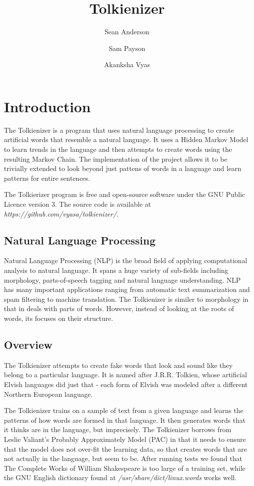 \documentclass[10pt]{article}
\begin{document}
\title{Tolkienizer}
\author{Sean Anderson \and Sam Payson \and Akanksha Vyas}

\section{Introduction}

The Tolkienizer is a program that uses natural language processing to create artificial
words that resemble a natural language. It uses a Hidden Markov Model to learn
trends in the language and then attempts to create words using the resulting Markov
Chain. The implementation of the project allows it to be trivially extended to
look beyond just pattens of words in a language and learn patterns 
for entire sentences.

The Tolkierizer program is free and open-source software under the GNU Public
Licence version 3. The source code is available at
\textit{https://github.com/vyasa/tolkienizer/}.

\subsection{Natural Language Processing}

Natural Language Processing (NLP) is the broad field of applying computational
analysis to natural language. It spans a huge variety of sub-fields including
morphology, parts-of-speech tagging and natural language understanding. NLP has
many important applications ranging from automatic text summarization and spam
filtering to machine translation. The Tolkienizer is similer to morphology in
that in deals with parts of words. However, instead of looking at the roots of
words, its focuses on their structure.

\subsection{Overview}
The Tolkienizer attempts to create
fake words that look and sound like they belong to a particular language. It
is named after J.R.R. Tolkien, whose artificial Elvish languages did just that
- each form of Elvish was modeled after a different Northern European language.

The Tolkienizer trains on a sample of text from a given language and learns
the patterns of how words are formed in that language. It then generates words
that it thinks are in the language, but imprecisely.
The Tolkienizer borrows from Leslie Valiant's Probably Approximately Model
(PAC) in that it needs to ensure that the model does not over-fit the learning
data\cite{val}, so that creates words that are not actually in the language, 
but seem to be. After running tests we found that The Complete Works of William
Shakespeare is too large of a training set, while the GNU English dictionary found
at \textit{/usr/share/dict/linux.words}  works well.
\end{document}
